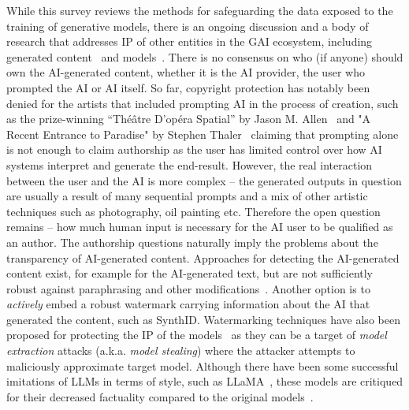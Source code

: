 \documentclass[conference]{IEEEtran}
\begin{document}
While this survey reviews the methods for safeguarding the data exposed to the training of generative models, there is an ongoing discussion and a body of research that addresses IP of other entities in the GAI ecosystem, including generated content~\cite{chesterman_good_2023} and models~\cite{ong_protecting_2021,peng_are_2023}. 
There is no consensus on who (if anyone) should own the AI-generated content, whether it is the AI provider, the user who prompted the AI or AI itself. 
So far, copyright protection has notably been denied for the artists that included prompting AI in the process of creation, such as the prize-winning “Théâtre D’opéra Spatial” by Jason M. Allen~\cite{roose_ai-generated_2022} and "A Recent Entrance to Paradise" by Stephen Thaler~\cite{brodkin_us_2023} claiming that prompting alone is not enough to claim authorship as the user has limited control over how AI systems interpret and generate the end-result. 
However, the real interaction between the user and the AI is more complex -- the generated outputs in question are usually a result of many sequential prompts and a mix of other artistic techniques such as photography, oil painting etc. 
Therefore the open question remains -- how much human input is necessary for the AI user to be qualified as an author. 
The authorship questions naturally imply the problems about the transparency of AI-generated content. 
Approaches for detecting the AI-generated content exist, for example for the AI-generated text, but are not sufficiently robust against paraphrasing and other modifications~\cite{sadasivan_can_2024}. 
Another option is to \textit{actively} embed a robust watermark carrying information about the AI that generated the content, such as SynthID.%
Watermarking techniques have also been proposed for protecting the IP of the models~\cite{ong_protecting_2021} as they can be a target of \textit{model extraction} attacks (a.k.a. \textit{model stealing}) where the attacker attempts to maliciously approximate target model.
Although there have been some successful imitations of LLMs in terms of style, such as LLaMA~\cite{touvron_llama_2023}, these models are critiqued for their decreased factuality compared to the original models~\cite{gudibande_false_2023}.
\end{document}
